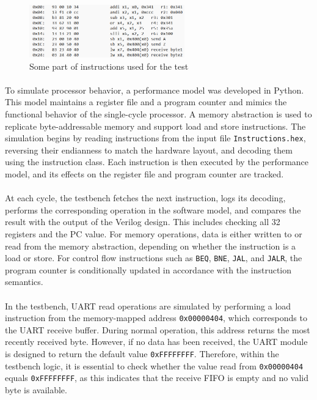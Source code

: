 \documentclass[12pt]{report}
\begin{document}
\begin{figure}[h]
    \centering
    \includegraphics[width=0.6\textwidth]{figures/exp_intrhex.png}
    \caption{Some part of instructions used for the test}
    \label{fig:instr}
\end{figure}

\paragraph{}
To simulate processor behavior, a performance model was developed in Python. This model maintains a register file and a program counter and mimics the functional behavior of the single-cycle processor. A memory abstraction is used to replicate byte-addressable memory and support load and store instructions. The simulation begins by reading instructions from the input file \texttt{Instructions.hex}, reversing their endianness to match the hardware layout, and decoding them using the instruction class. Each instruction is then executed by the performance model, and its effects on the register file and program counter are tracked.

\paragraph{}
At each cycle, the testbench fetches the next instruction, logs its decoding, performs the corresponding operation in the software model, and compares the result with the output of the Verilog design. This includes checking all 32 registers and the PC value. For memory operations, data is either written to or read from the memory abstraction, depending on whether the instruction is a load or store. For control flow instructions such as \texttt{BEQ}, \texttt{BNE}, \texttt{JAL}, and \texttt{JALR}, the program counter is conditionally updated in accordance with the instruction semantics.

 \paragraph{}
In the testbench, UART read operations are simulated by performing a load instruction from the memory-mapped address \texttt{0x00000404}, which corresponds to the UART receive buffer. During normal operation, this address returns the most recently received byte. However, if no data has been received, the UART module is designed to return the default value \texttt{0xFFFFFFFF}. Therefore, within the testbench logic, it is essential to check whether the value read from \texttt{0x00000404} equals \texttt{0xFFFFFFFF}, as this indicates that the receive FIFO is empty and no valid byte is available.
\end{document}
